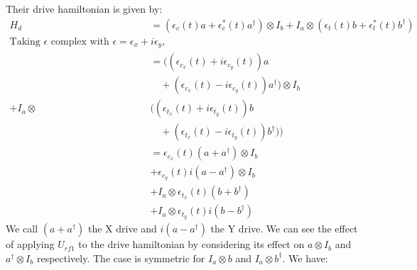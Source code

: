 \documentclass[letterpaper, 12pt]{article}
\begin{document}
Their drive hamiltonian is given by:
\begin{align*}
H_{d} &= (\epsilon_{c}(t)a + \epsilon^{*}_{c}(t)a^{\dagger}) \otimes I_{b}
+ I_{a} \otimes (\epsilon_{t}(t)b + \epsilon^{*}_{t}(t)b^{\dagger}) \\
\textrm{Taking $\epsilon$ complex with $\epsilon = \epsilon_{x} + i\epsilon_{y}$,} \\
&= ((\epsilon_{c_{x}}(t) + i\epsilon_{c_{y}}(t))a \\
   &\quad + (\epsilon_{c_{x}}(t) - i\epsilon_{c_{y}}(t))a^{\dagger}) \otimes I_{b} \\
   + I_{a} \otimes &((\epsilon_{t_{x}}(t) + i\epsilon_{t_{y}}(t))b \\
   &\quad + (\epsilon_{t_{x}}(t) - i\epsilon_{t_{y}}(t))b^{\dagger})) \\
   &= \epsilon_{c_{x}}(t)(a + a^{\dagger}) \otimes I_{b} \\
   &+ \epsilon_{c_{y}}(t)i(a - a^{\dagger}) \otimes I_{b} \\
   &+ I_{a} \otimes \epsilon_{t_{x}}(t)(b + b^{\dagger}) \\
   &+ I_{a} \otimes \epsilon_{t_{y}}(t)i(b - b^{\dagger})
\end{align*}
We call $(a + a^{\dagger})$ the X drive and $i(a - a^{\dagger})$ the Y drive.
We can see the effect of applying $U_{rf1}$ to the drive hamiltonian by considering its effect on $a \otimes I_{b}$ and $a^{\dagger} \otimes I_{b}$ respectively. The case is symmetric for $I_{a} \otimes b$ and $I_{a} \otimes b^{\dagger}$.
We have:
\end{document}
